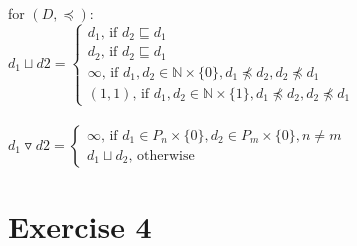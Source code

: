 \documentclass[fleqn,12pt]{article}
\begin{document}
for $(D,\preceq)$:\\
$d_1 \sqcup d2 =
\begin{cases}
d_1 \text{, if } d_2 \sqsubseteq d_1 \\
d_2 \text{, if } d_2 \sqsubseteq d_1 \\
\infty \text{, if } d_1,d_2 \in \mathbb{N}\times \{0\}, d_1 \not\preceq d_2, d_2 \not\preceq d_1 \\
(1,1) \text{, if } d_1,d_2 \in \mathbb{N}\times \{1\}, d_1 \not\preceq d_2, d_2 \not\preceq d_1
\end{cases}$\\\\

$d_1 \triangledown d2 =
\begin{cases}
\infty \text{, if } d_1 \in P_n \times \{0\}, d_2 \in P_m \times \{0\}, n \neq m\\
d_1 \sqcup d_2 \text{, otherwise}
\end{cases}$

\section*{Exercise 4}
\end{document}
